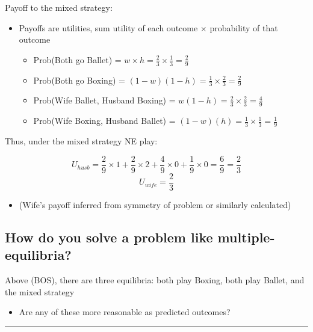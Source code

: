 \documentclass[]{article}
\providecommand{\tightlist}{%
  \setlength{\itemsep}{0pt}\setlength{\parskip}{0pt}}
\begin{document}
Payoff to the mixed strategy:

\begin{itemize}
\tightlist
\item
  Payoffs are utilities, sum utility of each outcome \(\times\) probability of that outcome

  \begin{itemize}
  \tightlist
  \item
    Prob(Both go Ballet) = \(w \times h = \frac{2}{3} \times \frac{1}{3} = \frac{2}{9}\)
  \item
    Prob(Both go Boxing) = \((1-w)(1-h) = \frac{1}{3} \times \frac{2}{3} = \frac{2}{9}\)
  \item
    Prob(Wife Ballet, Husband Boxing) = \(w(1-h) = \frac{2}{3} \times \frac{2}{3} = \frac{4}{9}\)
  \item
    Prob(Wife Boxing, Husband Ballet) = \((1-w)(h) = \frac{1}{3} \times \frac{1}{3} = \frac{1}{9}\)
  \end{itemize}
\end{itemize}

\bigskip

Thus, under the mixed strategy NE play:

\[U_{husb} =  \frac{2}{9} \times 1 +  \frac{2}{9} \times 2 +  \frac{4}{9} \times 0 + \frac{1}{9} \times 0 = \frac{6}{9} = \frac{2}{3}\]
\[U_{wife} = \frac{2}{3}\]

\begin{itemize}
\tightlist
\item
  (Wife's payoff inferred from symmetry of problem or similarly calculated)
\end{itemize}

\hypertarget{how-do-you-solve-a-problem-like-multiple-equilibria}{%
\subsection{How do you solve a problem like multiple-equilibria?}\label{how-do-you-solve-a-problem-like-multiple-equilibria}}

\bigskip

Above (BOS), there are three equilibria: both play Boxing, both play Ballet, and the mixed strategy

\begin{itemize}
\tightlist
\item
  Are any of these more reasonable as predicted outcomes?
\end{itemize}

\begin{center}\rule{0.5\linewidth}{\linethickness}\end{center}
\end{document}
